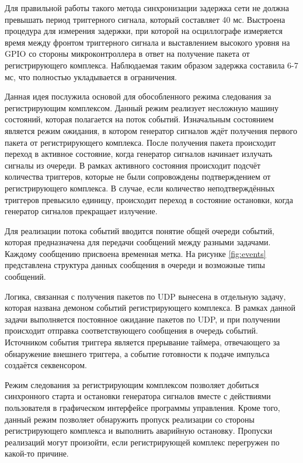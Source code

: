 \documentclass{report}
\begin{document}
Для правильной работы такого метода синхронизации задержка сети не должна превышать период триггерного сигнала, который составляет 40 мс. Выстроена процедура для измерения задержки, при которой на осциллографе измеряется время между фронтом триггерного сигнала и выставлением высокого уровня на GPIO со стороны микроконтроллера в ответ на получение пакета от регистрирующего комплекса. Наблюдаемая таким образом задержка составила 6-7 мс, что полностью укладывается в ограничения.


Данная идея послужила основой для обособленного режима следования за регистрирующим комплексом. Данный режим реализует несложную машину состояний, которая полагается на поток событий. Изначальным состоянием является режим ожидания, в котором генератор сигналов ждёт получения первого пакета от регистрирующего комплекса. После получения пакета происходит переход в активное состояние, когда генератор сигналов начинает излучать сигналы из очереди. В рамках активного состояния происходит подсчёт количества триггеров, которые не были сопровождены подтверждением от регистрирующего комплекса. В случае, если количество неподтверждённых триггеров превысило единицу, происходит переход в состояние остановки, когда генератор сигналов прекращает излучение.

Для реализации потока событий вводится понятие общей очереди событий, которая предназначена для передачи сообщений между разными задачами. Каждому сообщению присвоена временная метка. На рисунке \ref{fig:events} представлена структура данных сообщения в очереди и возможные типы сообщений.


Логика, связанная с получения пакетов по UDP вынесена в отдельную задачу, которая названа демоном событий регистрирующего комплекса. В рамках данной задачи выполняется постоянное ожидание пакетов по UDP, и при получении происходит отправка соответствующего сообщения в очередь событий. Источником события триггера является прерывание таймера, отвечающего за обнаружение внешнего триггера, а событие готовности к подаче импульса создаётся секвенсором.

Режим следования за регистрирующим комплексом позволяет добиться синхронного старта и остановки генератора сигналов вместе с действиями пользователя в графическом интерфейсе программы управления. Кроме того, данный режим позволяет обнаружить пропуск реализации со стороны регистрирующего комплекса и выполнить аварийную остановку. Пропуски реализаций могут произойти, если регистрирующей комплекс перегружен по какой-то причине.
\end{document}
